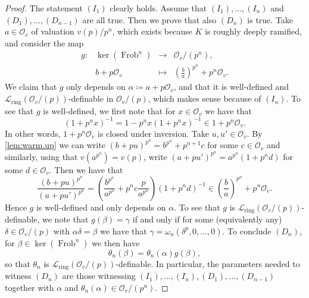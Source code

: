 \documentclass[a4paper]{amsart}
\theoremstyle{mystyle2}
\theoremstyle{mystyle}
\DeclareMathOperator{\Frob}{Frob}
\renewcommand{\L}{\mathcal{L}}
\newcommand{\Lring}{\L_{\mathrm{ring}}}
\renewcommand{\O}{\mathcal{O}}
\numberwithin{equation}{section}
\begin{document}
\begin{proof}
        The statement $(I_1)$ clearly holds.
        Assume that $(I_1), \ldots, (I_n)$ and $(D_1), \ldots, (D_{n-1})$ are all true.
        Then we prove that also $(D_n)$ is true. 
        Take $a\in \O_v$ of valuation $v(p)/p^n$, which exists because $K$ is roughly deeply ramified, and consider the map
        \[
        \begin{array}{rrcl}
            g\colon  & \ker(\Frob^n) &\to & \O_v / (p^n), \\
            & b+p\O_v & \mapsto & \left( \frac{b}{a} \right)^{p^n} + p^n\O_v. 
        \end{array}
        \]
        We claim that $g$ only depends on $\alpha \coloneqq a + p \O_v$, 
        and that it is well-defined and $\Lring(\O_v/(p))$-definable in $\O_v/(p)$, which makes sense because of $(I_n)$.
        To see that $g$ is well-defined, we first note that for $x\in \O_v$ we have that
        \[
        (1+p^nx)^{-1} = 1 - {p^nx}(1+p^nx)^{-1}\in 1+p^n\O_v.
        \]
        In other words, $1+p^n\O_v$ is closed under inversion.
        Take $u, u'\in \O_v$. 
        By \cref{lem:warm.up} we can write $(b+pu)^{p^n} = b^{p^n} + p^{n+1}c$ for some $c\in \O_v$ and similarly, using that $v(a^{p^n}) = v(p)$, write $(a+pu')^{p^n} = a^{p^n}(1+p^nd)$ for some $d\in \O_v$.
        Then we have that
        \[
        \frac{(b+pu)^{p^n}}{(a+pu')^{p^n}} = \left(\frac{b^{p^n}}{a^{p^n}} + p^n c \frac{p}{a^{p^n}}\right)(1+p^n d)^{-1}\in\left( \frac{b}{a}\right)^{p^n} + p^n\O_v.
        \]
        Hence $g$ is well-defined and only depends on \( \alpha \).
        To see that $g$ is $\Lring(\O_v/(p))$-definable, we note that $g(\beta) = \gamma$ if and only if for some (equivalently any) $\delta\in \O_v/(p)$ with $\alpha \delta = \beta$ we have that $\gamma = \omega_n(\delta^p, 0, \ldots, 0)$.
        To conclude $(D_n)$, for $\beta\in \ker(\Frob^n)$ we then have
        \[
        \theta_n(\beta) = \theta_n(\alpha)g(\beta),
        \]
        so that $\theta_n$ is $\Lring(\O_v/(p))$-definable.
        In particular, the parameters needed to witness $(D_n)$ are those witnessing \( (I_1),\ldots,(I_n),(D_1),\ldots,(D_{n-1}) \) together with $\alpha$ and $\theta_n(\alpha)\in \O_v/(p^n)$.
        


\end{proof}
\end{document}
